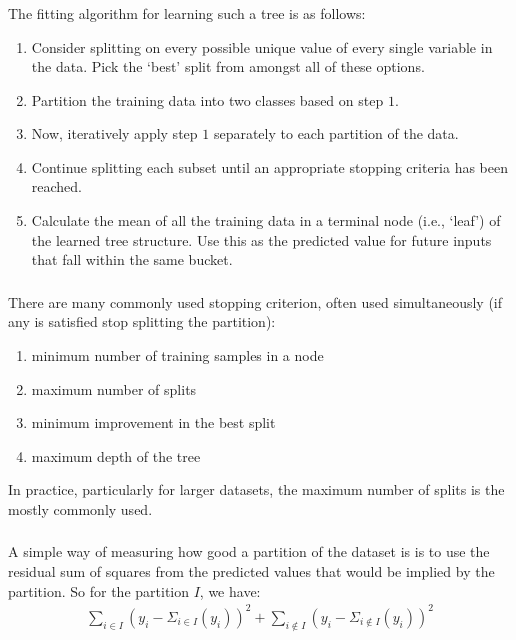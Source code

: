 \documentclass[xetex,mathserif,serif,aspectratio=169]{beamer}
\begin{document}
\begin{frame}[fragile] \frametitle{} \oldB \small

\textbf{}

The fitting algorithm for learning such a tree is as follows:
\begin{enumerate}
\item Consider splitting on every possible unique value of every
single variable in the data. Pick the `best' split from amongst
all of these options.\pause
\item Partition the training data into two classes based on step $1$.\pause
\item Now, iteratively apply step $1$ separately to each partition of
the data.\pause
\item Continue splitting each subset until an appropriate
stopping criteria has been reached.\pause
\item Calculate the mean of all the training data in a terminal node
(i.e., `leaf') of the learned tree structure. Use this as the predicted
value for future inputs that fall within the same bucket.
\end{enumerate}

\end{frame}

\begin{frame}[fragile] \frametitle{} \oldB \small

\textbf{}

There are many commonly used stopping criterion, often used
simultaneously (if any is satisfied stop splitting the partition):
\begin{enumerate}
\item minimum number of training samples in a node
\item maximum number of splits
\item minimum improvement in the best split
\item maximum depth of the tree
\end{enumerate}
In practice, particularly for larger datasets, the maximum number
of splits is the mostly commonly used.

\end{frame}

\begin{frame}[fragile] \frametitle{} \oldB \small

\textbf{}

A simple way of measuring how good a partition of the dataset is
is to use the residual sum of squares from the predicted values that would
be implied by the partition. So for the partition $I$, we have:
\begin{align*}
\sum_{i \in I} (y_i - \Sigma_{i \in I}(y_i))^2 + \sum_{i \notin I} (y_i - \Sigma_{i \notin I}(y_i))^2
\end{align*}

\end{frame}
\end{document}
